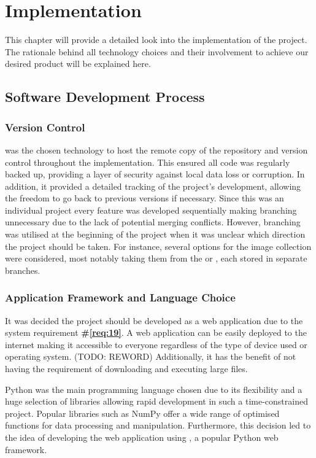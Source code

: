 \documentclass{l4proj}
\begin{document}
\chapter{Implementation}
This chapter will provide a detailed look into the implementation of the project. The rationale behind all technology choices and their involvement to achieve our desired product will be explained here. 

\section{Software Development Process}
\subsection{Version Control}
\cite{github} was the chosen technology to host the remote copy of the repository and version control throughout the implementation. This ensured all code was regularly backed up, providing a layer of security against local data loss or corruption. In addition, it provided a detailed tracking of the project's development, allowing the freedom to go back to previous versions if necessary. Since this was an individual project every feature was developed sequentially making branching unnecessary due to the lack of potential merging conflicts. However, branching was utilised at the beginning of the project when it was unclear which direction the project should be taken. For instance, several options for the image collection were considered, most notably taking them from the \cite{wikimedia_commons} or \cite{imagenet}, each stored in separate branches.


\subsection{Application Framework and Language Choice}
It was decided the project should be developed as a web application due to the system requirement \textbf{\#\ref{req:19}}. A web application can be easily deployed to the internet making it accessible to everyone regardless of the type of device used or operating system. (TODO: REWORD) Additionally, it has the benefit of not having the requirement of downloading and executing large files.

Python \citep{python} was the main programming language chosen due to its flexibility and a huge selection of libraries allowing rapid development in such a time-constrained project. Popular libraries such as NumPy \citep{harris2020numpy} offer a wide range of optimised functions for data processing and manipulation. Furthermore, this decision led to the idea of developing the web application using \cite{django}, a popular Python web framework.
\end{document}
